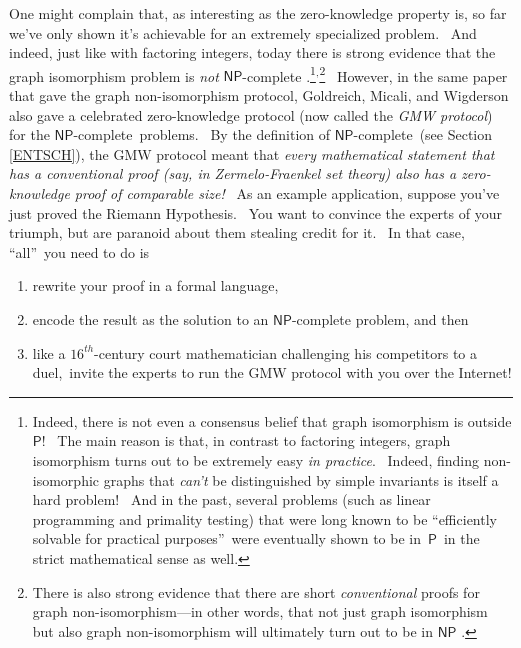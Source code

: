 \documentclass[12pt,onecolumn]{article}%
\begin{document}
One might complain that, as interesting as the zero-knowledge property is, so
far we've only shown it's achievable for an extremely specialized problem.
\ And indeed, just like with factoring integers, today there is strong
evidence that the graph isomorphism problem is \textit{not} $\mathsf{NP}%
$-complete \cite{bhz}.\footnote{Indeed, there is not even a consensus belief
that graph isomorphism is outside $\mathsf{P}$! \ The main reason is that, in
contrast to factoring integers, graph isomorphism turns out to be extremely
easy \textit{in practice}. \ Indeed, finding non-isomorphic graphs that
\textit{can't} be distinguished by simple invariants is itself a hard problem!
\ And in the past, several problems (such as linear programming and primality
testing) that were long known to be \textquotedblleft efficiently solvable for
practical purposes\textquotedblright\ were eventually shown to be
in\ $\mathsf{P}$\ in the strict mathematical sense as well.}$^{,}%
$\footnote{There is also strong evidence that there are short
\textit{conventional} proofs for graph non-isomorphism---in other words, that
not just graph isomorphism but also graph non-isomorphism will ultimately turn
out to be in $\mathsf{NP}$ \cite{kvm}.} \ However, in the same paper that gave
the graph non-isomorphism protocol, Goldreich, Micali, and Wigderson
\cite{gmw} also gave a celebrated zero-knowledge protocol (now called the
\textit{GMW protocol}) for the $\mathsf{NP}$-complete\ problems. \ By the
definition of $\mathsf{NP}$-complete\ (see Section \ref{ENTSCH}), the GMW
protocol meant that \textit{every mathematical statement that has a
conventional proof (say, in Zermelo-Fraenkel set theory) also has a
zero-knowledge proof of comparable size!} \ As an example application, suppose
you've just proved the Riemann Hypothesis. \ You want to convince the experts
of your triumph, but are paranoid about them stealing credit for it. \ In that
case, \textquotedblleft all\textquotedblright\ you need to do is

\begin{enumerate}
\item[(1)] rewrite your proof in a formal language,

\item[(2)] encode the result as the solution to an $\mathsf{NP}$-complete
problem, and then

\item[(3)] like a $16^{th}$-century court mathematician challenging his
competitors to a duel,\ invite the experts to run the GMW protocol with you
over the Internet!
\end{enumerate}
\end{document}

